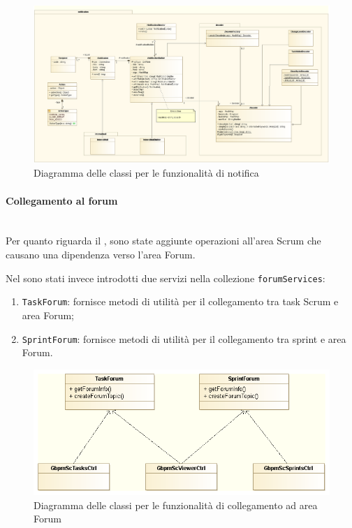 \begin{landscape}
\begin{figure}%
\centering
\includegraphics[width=\columnwidth]{immagini/notif-class_diagram}
\caption{Diagramma delle classi per le funzionalità di notifica}
\label{fig:arch-notif}%
\end{figure}
\end{landscape}

\paragraph{Collegamento al forum} \mbox{} \\

Per quanto riguarda il \BKEND{}, sono state aggiunte operazioni all'area
Scrum che causano una dipendenza verso l'area Forum.

Nel \FREND{} sono stati invece introdotti due servizi nella collezione
\texttt{forumServices}:

\begin{enumerate}
\item \texttt{TaskForum}: fornisce metodi di utilità per il collegamento tra
  task Scrum e area Forum;
\item \texttt{SprintForum}: fornisce metodi di utilità per il collegamento tra
  sprint e area Forum.
\end{enumerate}

\begin{figure}[H]%
\centering
\includegraphics[width=.8\columnwidth]{immagini/forumServices}
\caption{Diagramma delle classi per le funzionalità di collegamento ad area
Forum}
\label{fig:forum-cd}%
\end{figure}


